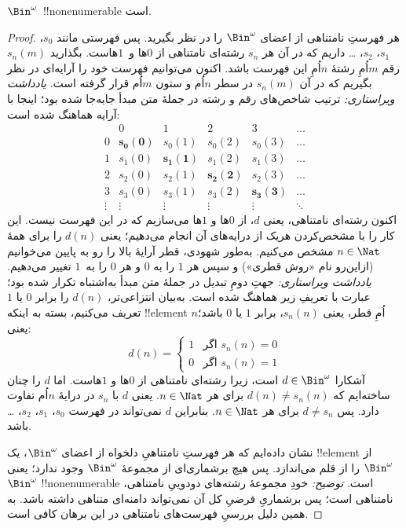 \documentclass[../../../include/open-logic-section]{subfiles}
\begin{document}
\begin{thm}
$\Bin^\omega$~!!{nonenumerable} است.
\end{thm}

\begin{proof}
هر فهرستِ نامتناهی از اعضای $\Bin^\omega$ را در نظر بگیرید. پس فهرستی
مانند $s_{0}$، $s_{1}$، $s_{2}$، \dots{} داریم که در آن هر $s_n$ رشته‌ای
نامتناهی از $0$ها و~$1$هاست. بگذارید $s_n(m)$ رقم $m$اُمِ رشتهٔ $n$اُمِ
این فهرست باشد. اکنون می‌توانیم فهرست خود را آرایه‌ای در نظر بگیریم که
در آن $s_n(m)$ در سطر $n$اُم و ستون $m$اُم قرار گرفته است.
\emph{یادداشت ویراستاری:} ترتیب شاخص‌های رقم و رشته در جملهٔ متن مبدأ
جابه‌جا شده بود؛ اینجا با آرایه هماهنگ شده است:
\[
\begin{array}{c|c|c|c|c|c}
& 0 & 1 & 2 & 3 & \dots \\\hline
0 & \mathbf{s_{0}(0)} & s_{0}(1) & s_{0}(2) & s_0(3) & \dots \\\hline
1 & s_{1}(0)& \mathbf{s_{1}(1)} & s_1(2) & s_1(3) & \dots \\\hline
2 & s_{2}(0)& s_{2}(1) & \mathbf{s_2(2)} & s_2(3) & \dots \\\hline
3 & s_{3}(0)& s_{3}(1) & s_3(2) & \mathbf{s_3(3)} & \dots \\\hline
\vdots & \vdots & \vdots & \vdots & \vdots & \mathbf{\ddots}
\end{array}
\]
اکنون رشته‌ای نامتناهی، یعنی $d$، از $0$ها و $1$ها می‌سازیم که در این
فهرست نیست. این کار را با مشخص‌کردن هریک از درایه‌های آن انجام می‌دهیم؛
یعنی $d(n)$ را برای همهٔ $n \in \Nat$ مشخص می‌کنیم. به‌طور شهودی، قطر
آرایهٔ بالا را رو به پایین می‌خوانیم (ازاین‌رو نام «روش قطری») و سپس هر
$1$ را به $0$ و هر $0$ را به~$1$ تغییر می‌دهیم.
\emph{یادداشت ویراستاری:} جهتِ دومِ تبدیل در جملهٔ متن مبدأ به‌اشتباه
تکرار شده بود؛ عبارت با تعریفِ زیر هماهنگ شده است. به‌بیان انتزاعی‌تر،
$d(n)$ را برابر $0$ یا $1$ تعریف می‌کنیم، بسته به اینکه !!{element}
$n$اُمِ قطر، یعنی $s_n(n)$، برابر $1$ یا $0$ باشد؛ یعنی:
\[
d(n) =
\begin{cases}
1 & \text{اگر $s_{n}(n) = 0$}\\
0 & \text{اگر $s_{n}(n) = 1$}
\end{cases}
\]
آشکارا $d \in \Bin^\omega$ است، زیرا رشته‌ای نامتناهی از $0$ها و $1$هاست.
اما $d$ را چنان ساخته‌ایم که $d(n) \neq s_n(n)$ برای هر $n \in \Nat$.
یعنی $d$ با $s_n$ در درایهٔ $n$اُم تفاوت دارد. پس $d \neq s_n$
برای هر $n\in \Nat$. بنابراین $d$ نمی‌تواند در فهرست
$s_0$، $s_1$، $s_2$،
\dots باشد.

نشان داده‌ایم که هر فهرستِ نامتناهیِ دلخواه از اعضای $\Bin^\omega$،
یک !!{element} از $\Bin^\omega$ را از قلم می‌اندازد. پس هیچ برشماری‌ای
از مجموعهٔ $\Bin^\omega$ وجود ندارد؛ یعنی $\Bin^\omega$
!!{nonenumerable} است.
\emph{توضیح:} خودِ مجموعهٔ رشته‌های دودوییِ نامتناهی، نامتناهی است؛ پس
برشماریِ فرضیِ کل آن نمی‌تواند دامنه‌ای متناهی داشته باشد. به همین دلیل
بررسیِ فهرست‌های نامتناهی در این برهان کافی است.
\end{proof}
\end{document}
